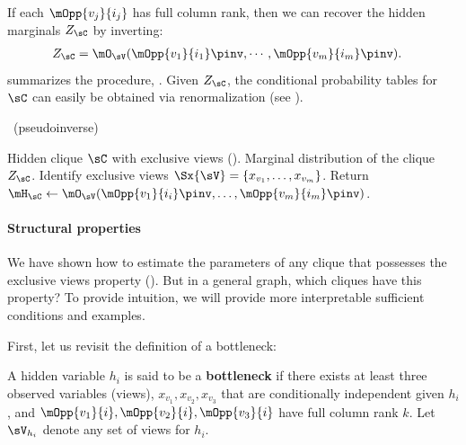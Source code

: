 If each $\mOpp{v_j}{i_j}$ has full column rank, then we can recover the
hidden marginals $Z_\sC$ by inverting:
\begin{align*}
  Z_{\sC} &= \mO_\sV(\mOpp{v_1}{i_1}\pinv,\cdots,\mOpp{v_m}{i_m}\pinv).
\end{align*}
 summarizes the procedure, \LearnClique.
Given $Z_\sC$, the conditional probability tables for $\sC$ can easily be
obtained via renormalization (see ).

\begin{algorithm}
  \caption{\LearnClique~(pseudoinverse)}
  \label{algo:learnclique}
  \begin{algorithmic}
    \REQUIRE Hidden clique $\sC$ with exclusive views ().
    \ENSURE Marginal distribution of the clique $Z_\sC$.
      \STATE Identify exclusive views $\Sx{\sV} = \{x_{v_1}, \dots, x_{v_m}\}$.
      \STATE Return $\mH_\sC \gets \mO_{\sV}( \mOpp{v_1}{i_i}\pinv, \dots, {\mOpp{v_m}{i_m}}\pinv )$.
  \end{algorithmic}
\end{algorithm}

\paragraph{Structural properties}

We have shown how to estimate the parameters of any clique that possesses the exclusive
  views property ().
  But in a general graph, which cliques have this property?
  To provide intuition, we will provide more interpretable sufficient conditions
  and examples.

First, let us revisit the definition of a bottleneck:
\begin{definition}[Bottleneck]
  A hidden variable $h_i$ is said to be a \textbf{bottleneck} if there
  exists at least three observed variables (views), $x_{v_1}, x_{v_2}, x_{v_3}$
  that are conditionally independent given $h_i$,
  and $\mOpp{v_1}{i},\mOpp{v_2}{i},\mOpp{v_3}{i}$ have full column rank $k$.
  Let $\sV_{h_i}$ denote any set of views for $h_i$.
\end{definition}

